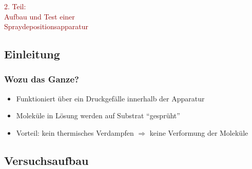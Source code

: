 \documentclass{beamer}
\begin{document}


\begin{frame}
\frametitle{}
\begin{center}
\textcolor{darkred}{\huge{2. Teil:\\ \vspace{0.65cm}
 Aufbau und Test einer\\ \vspace{0.5cm}Spraydepositionsapparatur}}
\end{center}


\end{frame}



\subsection[Motivation]{Einleitung}

\begin{frame}
\frametitle{Wozu das Ganze?}
\begin{itemize}\setlength{\itemsep}{+15pt}
  \item Funktioniert über ein Druckgefälle innerhalb der Apparatur
  \item Moleküle in Lösung werden auf Substrat "`gesprüht"'
  \item Vorteil: kein thermisches Verdampfen $\Rightarrow$ keine Verformung der Moleküle
\end{itemize}
\end{frame}



\subsection[Versuchsaufbau]{Versuchsaufbau}
\end{document}
